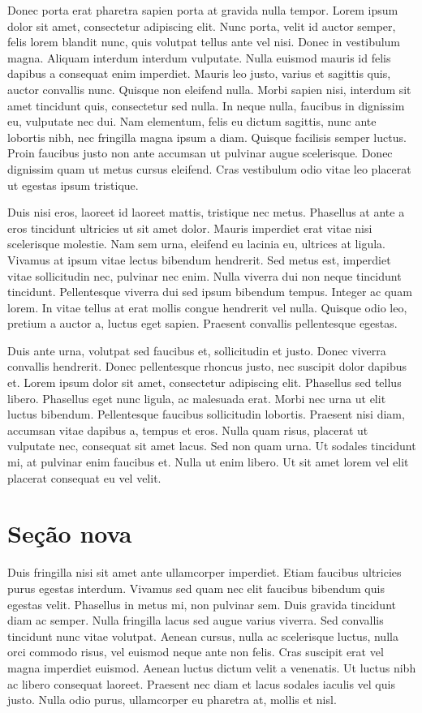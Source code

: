 Donec porta erat pharetra sapien porta at gravida nulla tempor. Lorem
ipsum dolor sit amet, consectetur adipiscing elit. Nunc porta, velit
id auctor semper, felis lorem blandit nunc, quis volutpat tellus ante
vel nisi. Donec in vestibulum magna. Aliquam interdum interdum
vulputate. Nulla euismod mauris id felis dapibus a consequat enim
imperdiet. Mauris leo justo, varius et sagittis quis, auctor convallis
nunc. Quisque non eleifend nulla. Morbi sapien nisi, interdum sit amet
tincidunt quis, consectetur sed nulla. In neque nulla, faucibus in
dignissim eu, vulputate nec dui. Nam elementum, felis eu dictum
sagittis, nunc ante lobortis nibh, nec fringilla magna ipsum a
diam. Quisque facilisis semper luctus. Proin faucibus justo non ante
accumsan ut pulvinar augue scelerisque. Donec dignissim quam ut metus
cursus eleifend. Cras vestibulum odio vitae leo placerat ut egestas
ipsum tristique.

Duis nisi eros, laoreet id laoreet mattis, tristique nec
metus. Phasellus at ante a eros tincidunt ultricies ut sit amet
dolor. Mauris imperdiet erat vitae nisi scelerisque molestie. Nam sem
urna, eleifend eu lacinia eu, ultrices at ligula. Vivamus at ipsum
vitae lectus bibendum hendrerit. Sed metus est, imperdiet vitae
sollicitudin nec, pulvinar nec enim. Nulla viverra dui non neque
tincidunt tincidunt. Pellentesque viverra dui sed ipsum bibendum
tempus. Integer ac quam lorem. In vitae tellus at erat mollis congue
hendrerit vel nulla. Quisque odio leo, pretium a auctor a, luctus eget
sapien. Praesent convallis pellentesque egestas.

Duis ante urna, volutpat sed faucibus et, sollicitudin et justo. Donec
viverra convallis hendrerit. Donec pellentesque rhoncus justo, nec
suscipit dolor dapibus et. Lorem ipsum dolor sit amet, consectetur
adipiscing elit. Phasellus sed tellus libero. Phasellus eget nunc
ligula, ac malesuada erat. Morbi nec urna ut elit luctus
bibendum. Pellentesque faucibus sollicitudin lobortis. Praesent nisi
diam, accumsan vitae dapibus a, tempus et eros. Nulla quam risus,
placerat ut vulputate nec, consequat sit amet lacus. Sed non quam
urna. Ut sodales tincidunt mi, at pulvinar enim faucibus et. Nulla ut
enim libero. Ut sit amet lorem vel elit placerat consequat eu vel
velit.

\section{Se\c{c}\~ao nova}

Duis fringilla nisi sit amet ante ullamcorper imperdiet. Etiam
faucibus ultricies purus egestas interdum. Vivamus sed quam nec elit
faucibus bibendum quis egestas velit. Phasellus in metus mi, non
pulvinar sem. Duis gravida tincidunt diam ac semper. Nulla fringilla
lacus sed augue varius viverra. Sed convallis tincidunt nunc vitae
volutpat. Aenean cursus, nulla ac scelerisque luctus, nulla orci
commodo risus, vel euismod neque ante non felis. Cras suscipit erat
vel magna imperdiet euismod. Aenean luctus dictum velit a
venenatis. Ut luctus nibh ac libero consequat laoreet. Praesent nec
diam et lacus sodales iaculis vel quis justo. Nulla odio purus,
ullamcorper eu pharetra at, mollis et nisl.

